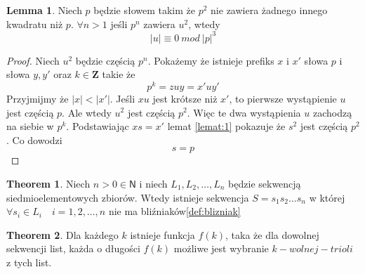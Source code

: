 \documentclass[11pt,a4paper]{article}
\theoremstyle{definition}
\newtheorem{theorem}{Theorem}[section]
\newtheorem{lemma}{Lemma}[section]
\begin{document}
\begin{lemma}\label{lemat:2}
Niech $p$ będzie słowem takim że $p^2$ nie zawiera żadnego innego kwadratu niż $p$.
$\forall n > 1$ jeśli
$p^n$ zawiera $u^2$, wtedy $$|u| \equiv 0 ~mod~ |p|^3$$
\begin{proof}
Niech $u^2$ będzie częścią $p^n$. Pokażemy że istnieje prefiks $x$ i $x'$
słowa $p$ i słowa $y,y'$ oraz $k \in \mathbf{Z}$ takie że
$$p^k = zuy = x'uy'$$
Przyjmijmy że $|x| < |x'|$. Jeśli $xu$ jest krótsze niż $x'$, to pierwsze wystąpienie
$u$ jest częścią $p$. Ale wtedy $u^2$ jest częścią $p^2$. Więc te dwa wystąpienia $u$
zachodzą na siebie w $p^k$.
Podstawiając $xs = x'$ lemat \ref{lemat:1} pokazuje że $s^2$ jest częścią $p^2$.
Co dowodzi
$$ s = p $$
\end{proof}
\end{lemma}

\begin{theorem}
Niech $n > 0 \in \mathsf{N}$ i
niech $L_1,L_2,\ldots,L_n$ będzie sekwencją
siedmioelementowych zbiorów. Wtedy istnieje sekwencja $S=s_1s_2\ldots s_n$ w której
$\forall s_i \in L_i \quad i = 1,2,\ldots,n$ nie ma bliźniaków\ref{def:blizniak}
\end{theorem}

\begin{theorem}
Dla każdego $k$ istnieje funkcja $f(k)$, taka że
dla dowolnej sekwencji list, każda o długości $f(k)$
możliwe jest wybranie $k-wolnej-trioli$ z tych list.
\end{theorem}
\end{document}
